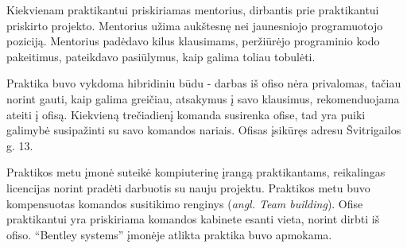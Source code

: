 Kiekvienam praktikantui priskiriamas mentorius, dirbantis prie praktikantui priskirto projekto. Mentorius užima aukštesnę nei jaunesniojo programuotojo poziciją. Mentorius padėdavo kilus klausimams, peržiūrėjo programinio kodo pakeitimus, pateikdavo pasiūlymus, kaip galima toliau tobulėti.

Praktika buvo vykdoma hibridiniu būdu - darbas iš ofiso nėra privalomas, tačiau norint gauti, kaip galima greičiau, atsakymus į savo klausimus, rekomenduojama ateiti į ofisą. Kiekvieną trečiadienį komanda susirenka ofise, tad yra puiki galimybė susipažinti su savo komandos nariais. Ofisas įsikūręs adresu Švitrigailos g. 13.

Praktikos metu įmonė suteikė kompiuterinę įrangą praktikantams, reikalingas licencijas norint pradėti darbuotis su nauju projektu. Praktikos metu buvo kompensuotas komandos susitikimo renginys (\emph{angl. Team building}). Ofise praktikantui yra priskiriama komandos kabinete esanti vieta, norint dirbti iš ofiso. \enquote{Bentley systems} įmonėje atlikta praktika buvo apmokama.